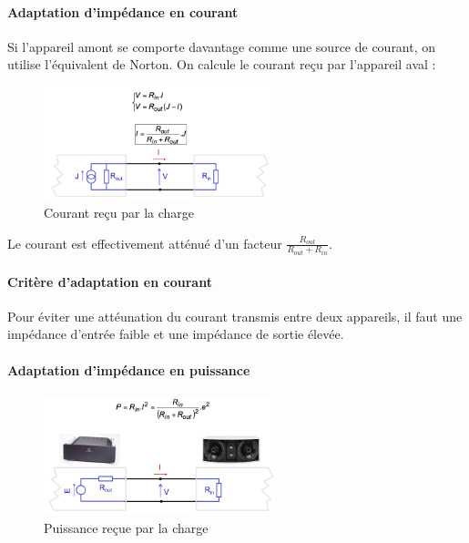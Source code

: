 \documentclass[a4paper]{article}
\begin{document}
    \paragraph{Adaptation d'impédance en courant} Si l'appareil amont se comporte
    davantage comme une source de courant, on utilise l'équivalent de Norton.
    On calcule le courant reçu par l'appareil aval : 
    \begin{figure}[H]
        \begin{center}
            \includegraphics[width=0.6\textwidth]{fig/2_adaptimpedcourant.png}
            \caption{Courant reçu par la charge}
            \label{fig:2_adaptimpedcourant}
        \end{center}
    \end{figure}
    Le courant est effectivement atténué d'un facteur $\frac{R_{out}}{R_{out}+R_{in}}$.

    \paragraph{Critère d'adaptation en courant} Pour éviter une attéunation du courant
    transmis entre deux appareils, il faut une impédance d'entrée faible
    et une impédance de sortie élevée.

    \paragraph{Adaptation d'impédance en puissance}
    \begin{figure}[H]
        \begin{center}
            \includegraphics[width=0.6\textwidth]{fig/2_adaptimpedpuissance.png}
            \caption{Puissance reçue par la charge}
            \label{fig:2_adaptimpedpuissance}
        \end{center}
    \end{figure}
\end{document}
